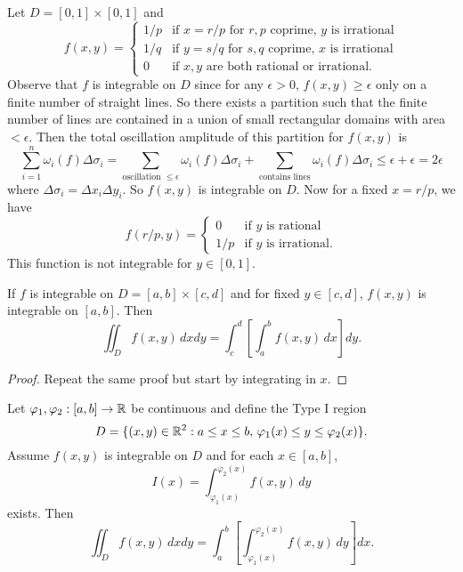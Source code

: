 \begin{example}
  Let $D = [0, 1] \times [0, 1]$ and
  \[
    f(x, y) =
    \begin{cases}
      1 / p & \text{if $x = r / p$ for $r, p$ coprime, $y$ is irrational} \\
      1 / q & \text{if $y = s / q$ for $s, q$ coprime, $x$ is irrational} \\
      0 & \text{if $x, y$ are both rational or irrational}.
    \end{cases}
  \]
  Observe that $f$ is integrable on $D$ since for any
  $\epsilon > 0$, $f(x, y) \ge \epsilon$ only on a finite
  number of straight lines. So there exists a partition
  such that the finite number of lines are contained in a
  union of small rectangular domains with area
  $< \epsilon$. Then the total oscillation amplitude
  of this partition for $f(x, y)$ is
  \[
    \sum_{i = 1}^n \omega_i(f) \Delta \sigma_i
    = \sum_{\text{oscillation $\le \epsilon$}} \omega_i(f) \Delta \sigma_i
    + \sum_{\text{contains lines}} \omega_i(f) \Delta \sigma_i
    \le \epsilon + \epsilon = 2\epsilon
  \]
  where $\Delta \sigma_i = \Delta x_i \Delta y_i$. So
  $f(x, y)$ is integrable on $D$. Now for a fixed
  $x = r / p$, we have
  \[
    f(r / p, y) =
    \begin{cases}
      0 & \text{if $y$ is rational} \\
      1 / p & \text{if $y$ is irrational}.
    \end{cases}
  \]
  This function is not integrable for $y \in [0, 1]$.
\end{example}

\begin{corollary}
  If $f$ is integrable on $D = [a, b] \times [c, d]$ 
  and for fixed $y \in [c, d]$, $f(x, y)$ is
  integrable on $[a, b]$. Then
  \[
    \iint_D f(x, y)\, dx dy = \int_c^d \left[\int_a^b f(x, y)\, dx\right] dy.
  \]
\end{corollary}

\begin{proof}
  Repeat the same proof but start by integrating in $x$.
\end{proof}

\begin{theorem}
  Let $\varphi_1, \varphi_2 : [a, b] \to \mathbb{R}$ be
  continuous and define the Type I region
  \[
    D = \{(x, y) \in \mathbb{R}^2 : a \le x \le b,\, \varphi_1(x) \le y \le \varphi_2(x)\}.
  \]
  Assume $f(x, y)$ is integrable on $D$ and for each
  $x \in [a, b]$,
  \[
    I(x) = \int_{\varphi_1(x)}^{\varphi_2(x)} f(x, y)\, dy
  \]
  exists. Then
  \[
    \iint_D f(x, y)\, dx dy = \int_a^b \left[\int_{\varphi_1(x)}^{\varphi_2(x)} f(x, y)\, dy\right] dx.
  \]
\end{theorem}


